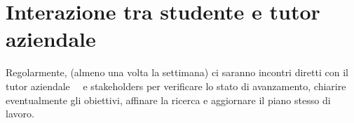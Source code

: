\section*{Interazione tra studente e tutor aziendale}

Regolarmente, (almeno una volta la settimana) ci saranno incontri
diretti con il tutor aziendale
\nomeTutorAziendale\ \cognomeTutorAziendale\ e stakeholders per
verificare lo stato di avanzamento, chiarire eventualmente gli
obiettivi, affinare la ricerca e aggiornare il piano stesso di lavoro.

